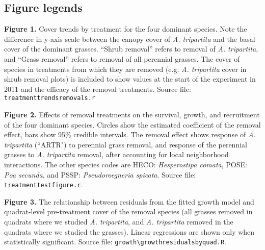 \documentclass[11pt]{article}
\begin{document}
\begin{doublespacing}
\newpage
\renewcommand{\refname}{Literature cited}



\newpage
\section*{Figure legends}

\textbf{Figure 1.} Cover trends by treatment for the four dominant species.  Note the difference in y-axis scale between the canopy cover of \textit{A. tripartita} and the basal cover of the dominant grasses. ``Shrub removal'' refers to removal of \textit{A. tripartita}, and ``Grass removal'' refers to removal of all perennial grasses. The cover of species in treatments from which they are removed (e.g. \textit{A. tripartita} cover in shrub removal plots) is included to show values at the start of the experiment in 2011 and the efficacy of the removal treatments. Source file: \texttt{treatment\textunderscore trends\textunderscore removals.r}

\vspace{3mm}

\noindent \textbf{Figure 2.} Effects of removal treatments on the survival, growth, and recruitment of the four dominant species. Circles show the estimated coefficient of the removal effect, bars show 95\% credible intervals. The removal effect shows response of \textit{A. tripartita} (``ARTR") to perennial grass removal, and response of the perennial grasses to \textit{A. tripartita} removal, after accounting for local neighborhood interactions. The other species codes are HECO: \textit{Hesperostipa comata}, POSE: \textit{Poa secunda}, and PSSP: \textit{Pseudoroegneria spicata}.
 Source file: \texttt{treatment\textunderscore test\textunderscore figure.r}.
 
 \vspace{3mm}
 
\noindent \textbf{Figure 3.} The relationship between residuals from the fitted growth model and quadrat-level pre-treatment cover of the removal species (all grasses removed in quadrats where we studied \textit{A. tripartita}, and \textit{A. tripartita} removed in the quadrats where we studied the grasses). Linear regressions are shown only when statistically significant. Source file:  \texttt{growth\textbackslash growth\textunderscore residuals\textunderscore by\textunderscore quad.R}.

\vspace{3mm}
 

\end{doublespacing}
\end{document}
